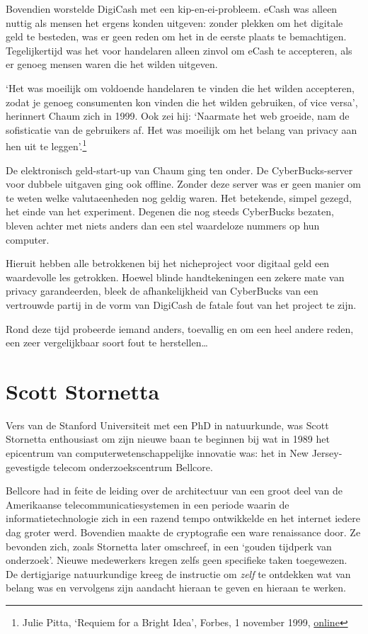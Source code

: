\documentclass[smalldemyvopaper,11pt,twoside,onecolumn,openright,extrafontsizes,hidelinks]{memoir}
\begin{document}
Bovendien worstelde DigiCash met een kip-en-ei-probleem. eCash was
alleen nuttig als mensen het ergens konden uitgeven: zonder plekken om
het digitale geld te besteden, was er geen reden om het in de eerste
plaats te bemachtigen. Tegelijkertijd was het voor handelaren alleen
zinvol om eCash te accepteren, als er genoeg mensen waren die het wilden
uitgeven.

`Het was moeilijk om voldoende handelaren te vinden die het wilden
accepteren, zodat je genoeg consumenten kon vinden die het wilden
gebruiken, of vice versa', herinnert Chaum zich in 1999. Ook zei hij:
`Naarmate het web groeide, nam de sofisticatie van de gebruikers af. Het
was moeilijk om het belang van privacy aan hen uit te
leggen'.\footnote{Julie Pitta, `Requiem for a Bright Idea', Forbes, 1
  november 1999,
  \href{https://www.forbes.com/forbes/1999/1101/6411390a.html}{online}}

De elektronisch geld-start-up van Chaum ging ten onder. De
CyberBucks-server voor dubbele uitgaven ging ook offline. Zonder deze
server was er geen manier om te weten welke valutaeenheden nog geldig
waren. Het betekende, simpel gezegd, het einde van het experiment.
Degenen die nog steeds CyberBucks bezaten, bleven achter met niets
anders dan een stel waardeloze nummers op hun computer.

Hieruit hebben alle betrokkenen bij het nicheproject voor digitaal geld
een waardevolle les getrokken. Hoewel blinde handtekeningen een zekere
mate van privacy garandeerden, bleek de afhankelijkheid van CyberBucks
van een vertrouwde partij in de vorm van DigiCash de fatale fout van het
project te zijn.

Rond deze tijd probeerde iemand anders, toevallig en om een heel andere
reden, een zeer vergelijkbaar soort fout te herstellen\ldots{}

\section{Scott Stornetta}\label{scott-stornetta}

Vers van de Stanford Universiteit met een PhD in natuurkunde, was Scott
Stornetta enthousiast om zijn nieuwe baan te beginnen bij wat in 1989
het epicentrum van computerwetenschappelijke innovatie was: het in New
Jersey-gevestigde telecom onderzoekscentrum Bellcore.

Bellcore had in feite de leiding over de architectuur van een groot deel
van de Amerikaanse telecommunicatiesystemen in een periode waarin de
informatietechnologie zich in een razend tempo ontwikkelde en het
internet iedere dag groter werd. Bovendien maakte de cryptografie een
ware renaissance door. Ze bevonden zich, zoals Stornetta later
omschreef, in een `gouden tijdperk van onderzoek'. Nieuwe medewerkers
kregen zelfs geen specifieke taken toegewezen. De dertigjarige
natuurkundige kreeg de instructie om \emph{zelf} te ontdekken wat van
belang was en vervolgens zijn aandacht hieraan te geven en hieraan te
werken.
\end{document}
